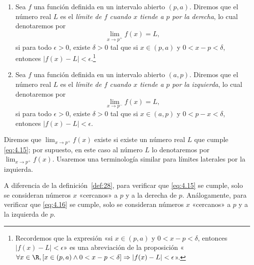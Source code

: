 \documentclass[12pt,a4paper]{book}
\begin{document}
    \begin{definicion}\label{def:30}
        \begin{enumerate}
            \item Sea $f$ una función definida en un intervalo abierto $(p,a)$. Diremos que el
            número real $L$ es el \textit{límite de $f$ cuando $x$ tiende a $p$ por la derecha}, lo cual
            denotaremos por
            \begin{equation}\label{eq:4.15}
                \lim_{x\to p^{+}}f(x)=L,
            \end{equation}
            si para todo $\epsilon>0$, existe $\delta>0$ tal que si $x\in(p,a)$ y $0<x-p<\delta$,
            entonces $|f(x)-L|<\epsilon$.\footnote{Recordemos que la expresión «si $x\in(p,a)$ y $0<x-p<\delta$, entonces $|f(x)-L|<\epsilon$» es
            una abreviación de la proposición «$\forall x\in\R,[x\in(p,a)\wedge 0<x-p<\delta]\Rightarrow|f(x)-L|<\epsilon$».}
            \item Sea $f$ una función definida en un intervalo abierto $(a,p)$. Diremos que el
            número real $L$ es el \textit{límite de $f$ cuando $x$ tiende a $p$ por la izquierda}, lo
            cual denotaremos por
            \begin{equation}\label{eq:4.16}
                \lim_{x\to p^{-}}f(x)=L,
            \end{equation}
            si para todo $\epsilon>0$, existe $\delta>0$ tal que si $x\in(a,p)$ y $0<p-x<\delta$,
            entonces $|f(x)-L|<\epsilon$.
        \end{enumerate}
    \end{definicion}

    Diremos que $\lim_{x\to p^{+}}f(x)$ existe si existe un número real $L$ que cumple
    \eqref{eq:4.15}; por supuesto, en este caso al número $L$ lo denotaremos por
    $\lim_{x\to p^{+}}f(x)$. Usaremos una terminología similar para límites laterales por
    la izquierda.

    \begin{observacion}\label{obs:11}
        A diferencia de la definición~\ref{def:28}, para verificar que \eqref{eq:4.15}
        se cumple, solo se consideran números $x$ «cercanos» a $p$ y a la derecha de $p$.
        Análogamente, para verificar que \eqref{eq:4.16} se cumple, solo se consideran números
        $x$ «cercanos» a $p$ y a la izquierda de $p$.
    \end{observacion}
\end{document}
